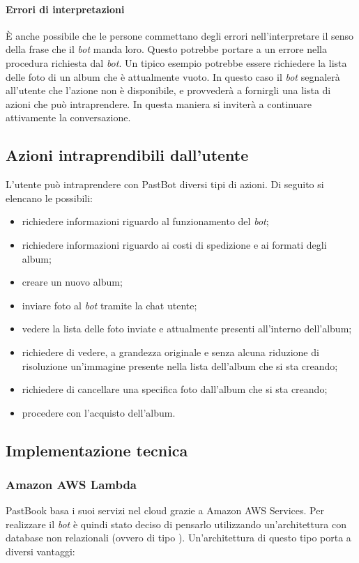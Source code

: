 \paragraph*{Errori di interpretazioni} È anche possibile che le persone
commettano degli errori nell'interpretare il senso della frase che il
\textit{bot} manda loro. Questo potrebbe portare a un errore nella procedura
richiesta dal \textit{bot}. Un tipico esempio potrebbe essere richiedere la
lista delle foto di un album che è attualmente vuoto. In questo caso il
\textit{bot} segnalerà all'utente che l'azione non è disponibile, e provvederà
a fornirgli una lista di azioni che può intraprendere. In questa maniera si
inviterà a continuare attivamente la conversazione.

\subsection{Azioni intraprendibili dall'utente}

L'utente può intraprendere con PastBot diversi tipi di azioni. Di seguito si
elencano le possibili:

\begin{itemize}

  \item richiedere informazioni riguardo al funzionamento del \textit{bot};
  \item richiedere informazioni riguardo ai costi di spedizione e ai formati
degli album;
  \item creare un nuovo album;
  \item inviare foto al \textit{bot} tramite la chat utente;
  \item vedere la lista delle foto inviate e attualmente presenti all'interno
dell'album;
  \item richiedere di vedere, a grandezza originale e senza alcuna riduzione di
risoluzione un'immagine presente nella lista dell'album che si sta creando;
  \item richiedere di cancellare una specifica foto dall'album che si sta
creando;
  \item procedere con l'acquisto dell'album.
\end{itemize}

\subsection{Implementazione tecnica}

\subsubsection{Amazon AWS Lambda}
PastBook basa i suoi servizi nel \gls{cloud} grazie a Amazon AWS Services.
Per realizzare il \textit{bot} è quindi stato deciso di pensarlo utilizzando
un'architettura  con database non relazionali
(ovvero di tipo ). Un'architettura di questo tipo porta a
diversi vantaggi:

